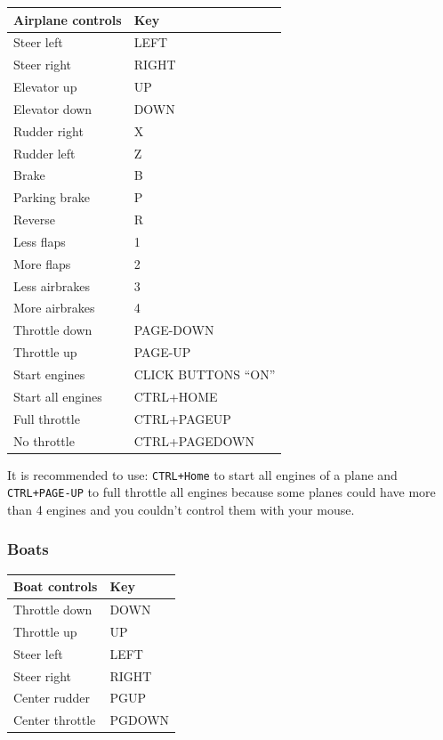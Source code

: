 \begin{tabular}{ |l|l| } 
\hline
Airplane controls & Key \\
\hline
Steer left & LEFT \\
\hline
Steer right & RIGHT \\
\hline
Elevator up & UP \\
\hline
Elevator down & DOWN \\
\hline
Rudder right & X \\
\hline
Rudder left & Z \\
\hline
Brake & B \\
\hline
Parking brake & P \\
\hline
Reverse & R \\
\hline
Less flaps & 1 \\
\hline
More flaps & 2 \\
\hline
Less airbrakes & 3 \\
\hline
More airbrakes & 4 \\
\hline
Throttle down & PAGE-DOWN \\
\hline
Throttle up & PAGE-UP \\
\hline
Start engines & CLICK BUTTONS ``ON'' \\
\hline
Start all engines & CTRL+HOME \\
\hline
Full throttle & CTRL+PAGEUP \\
\hline
No throttle & CTRL+PAGEDOWN \\
\hline
\end{tabular}

It is recommended to use: \texttt{CTRL+Home} to start all engines of a
plane and \texttt{CTRL+PAGE-UP} to full throttle all engines because
some planes could have more than 4 engines and you couldn't control them
with your mouse.

\hypertarget{boats}{%
\subsubsection{Boats}\label{boats}}

\begin{tabular}{ |l|l| } 
\hline
Boat controls & Key \\
\hline
Throttle down & DOWN \\
\hline
Throttle up & UP \\
\hline
Steer left & LEFT \\
\hline
Steer right & RIGHT \\
\hline
Center rudder & PGUP \\
\hline
Center throttle & PGDOWN \\
\hline
\end{tabular}

